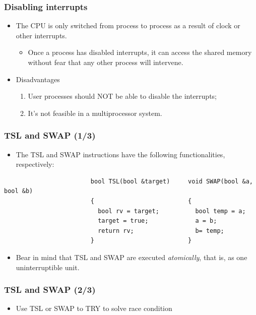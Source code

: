 \documentclass[CJKutf8,xcolor=pdftex,dvipsnames,table]{beamer}
\begin{document}
\begin{CJK*}{UTF8}{song}
  \begin{frame}
  \frametitle{Disabling interrupts} \pause
  \begin{itemize}
  \item{The CPU is only switched from process to process as a result of clock or other interrupts.} \pause
    \begin{itemize}
    \item{Once a process has disabled interrupts, it can access the shared memory without fear that any other process will intervene.} \pause
    \end{itemize}
  \item{Disadvantages} \pause
    \begin{enumerate}
    \item{User processes should NOT be able to disable the interrupts;} \pause
    \item{It's not feasible in a multiprocessor system.}
    \end{enumerate}
  \end{itemize}
  \end{frame}

  \begin{frame}[fragile]
  \frametitle{TSL and SWAP (1/3)} \pause
  \begin{itemize}
  \item{The TSL and SWAP instructions have the following functionalities, respectively:} \pause
  \end{itemize}

\begin{lstlisting}
						bool TSL(bool &target)     void SWAP(bool &a, bool &b)
						{                          {
						  bool rv = target;          bool temp = a;
						  target = true;             a = b;
						  return rv;                 b= temp;
						}                          }
\end{lstlisting}

  \pause

  \begin{itemize}
  \item{Bear in mind that TSL and SWAP are executed \emph{atomically}, that is, as one uninterruptible unit.}
  \end{itemize}
\end{frame}

  \begin{frame}[fragile]
  \frametitle{TSL and SWAP (2/3)} \pause
  \begin{itemize}
  \item{Use TSL or SWAP to TRY to solve race condition} \pause
  \end{itemize}


\end{frame}
\end{CJK*}
\end{document}
